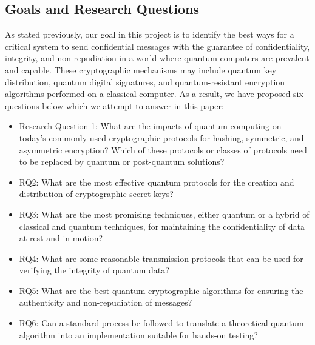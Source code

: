 \documentclass[sigconf]{acmart}
\begin{document}
\subsection{Goals and Research Questions}
As stated previously, our goal in this project is to identify the best ways for a critical system to send confidential messages with the guarantee of confidentiality, integrity, and non-repudiation in a world where quantum computers are prevalent and capable. These cryptographic mechanisms may include quantum key distribution, quantum digital signatures, and quantum-resistant encryption algorithms performed on a classical computer. As a result, we have proposed six questions below which we attempt to answer in this paper:
\begin{itemize}
\item Research Question 1: What are the impacts of quantum computing on today's commonly used cryptographic protocols for hashing, symmetric, and asymmetric encryption? Which of these protocols or classes of protocols need to be replaced by quantum or post-quantum solutions?
\item RQ2: What are the most effective quantum protocols for the creation and distribution of cryptographic secret keys?
\item RQ3: What are the most promising techniques, either quantum or a hybrid of classical and quantum techniques, for maintaining the confidentiality of data at rest and in motion?
\item RQ4: What are some reasonable transmission protocols that can be used for verifying the integrity of quantum data?
\item RQ5: What are the best quantum cryptographic algorithms for ensuring the authenticity and non-repudiation of messages?
\item RQ6: Can a standard process be followed to translate a theoretical quantum algorithm into an implementation suitable for hands-on testing?
\end{itemize}

\end{document}
